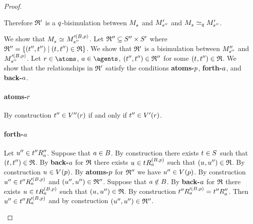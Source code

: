 \begin{proof}
\begin{description}
        Therefore $\bisimulation'$ is a $\atomQ$-bisimulation between $\kPModel{\kStateS}$ and $\kPModelP{\kStateSPP}$ and $\kPModel{\kStateS} \bisimilar[\atomQ] \kPModelP{\kStateSPP}$.

        We show that $\kPModel{\kStateS} \bisimilar \kPModel[\prime(\agentsB, \atomP)]{\kStateSPP}$.
        Let $\bisimulation'' \subseteq \kStatesPP \times \kStatesP$ where $\bisimulation'' = \{(\kStateTPP, \kStateTPP) \mid (\kStateT, \kStateTPP) \in \bisimulation\}$.
        We show that $\bisimulation'$ is a bisimulation between $\kPModelPP{\kStateSPP}$ and $\kPModel[\prime(\agentsB, \atomP)]{\kStateSPP}$.
        Let $\atomR \in \atoms$, $\agentA \in \agents$, $(\kStateTPP, \kStateTPP) \in \bisimulation''$ for some $(\kStateT, \kStateTPP) \in \bisimulation$.
        We show that the relationships in $\bisimulation'$ satisfy the conditions {\bf atoms-$\atomP$}, {\bf forth-$\agentA$}, and {\bf back-$\agentA$}.

        \paragraph{atoms-$\atomR$}
        By construction $\kStateTPP \in \kValuationPP(\atomR)$ if and only if $\kStateTPP \in \kValuationP(\atomR)$.

        \paragraph{forth-$\agentA$}
        Let $\kStateUPP \in \kSuccessorsPPA{\kStateTPP}$.
        Suppose that $\agentA \in \agentsB$.
        By construction there exists $\kStateT \in \kStates$ such that $(\kStateT, \kStateTPP) \in \bisimulation$.
        By {\bf back-$\agentA$} for $\bisimulation$ there exists $\kStateU \in \kSuccessorsA[(\agentsB, \atomP)]{\kStateT}$ such that $(\kStateU, \kStateUPP) \in \bisimulation$.
        By construction $\kStateU \in \kValuation(\atomP)$.
        By {\bf atoms-$\atomP$} for $\bisimulation''$ we have $\kStateUPP \in \kValuation(\atomP)$.
        By construction $\kStateUPP \in \kSuccessorsA[\prime(\agentsB, \atomP)]{\kStateTPP}$ and $(\kStateUPP, \kStateUPP) \in \bisimulation''$.
        Suppose that $\agentA \notin \agentsB$.
        By {\bf back-$\agentA$} for $\bisimulation$ there exists $\kStateU \in \kSuccessorsA[(\agentsB, \atomP)]{\kStateT}$ such that $(\kStateU, \kStateUPP) \in \bisimulation$.
        By construction $\kSuccessorsA[\prime(\agentsB, \atomP)]{\kStateTPP} = \kSuccessorsPPA{\kStateTPP}$.
        Then $\kStateUPP \in \kSuccessorsA[\prime(\agentsB, \atomP)]{\kStateTPP}$ and by construction $(\kStateUPP, \kStateUPP) \in \bisimulation''$.


\end{description}
\end{proof}
